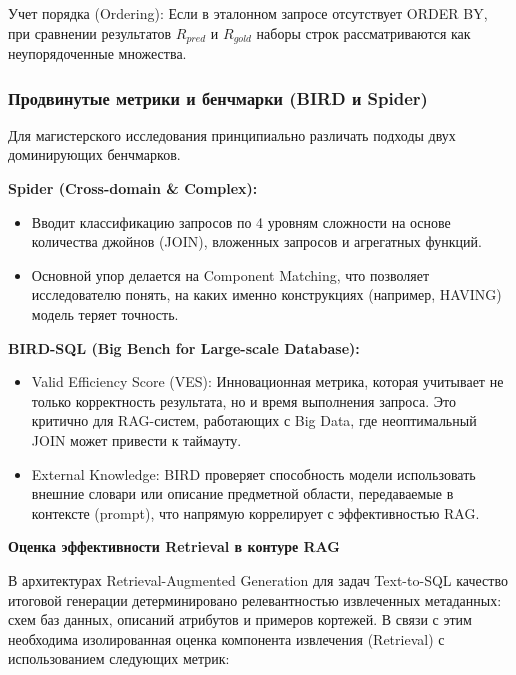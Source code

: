 Учет порядка (Ordering): Если в эталонном запросе отсутствует ORDER BY, при сравнении результатов $R_{pred}$ и $R_{gold}$ наборы строк рассматриваются как неупорядоченные множества.


\subsubsection{Продвинутые метрики и бенчмарки (BIRD и Spider)}

Для магистерского исследования принципиально различать подходы двух доминирующих бенчмарков.

\textbf{Spider (Cross-domain \& Complex):}

\begin{itemize}
    \item Вводит классификацию запросов по 4 уровням сложности на основе количества джойнов (JOIN), вложенных запросов и агрегатных функций.
    \item Основной упор делается на Component Matching, что позволяет исследователю понять, на каких именно конструкциях (например, HAVING) модель теряет точность.
\end{itemize}

\textbf{BIRD-SQL (Big Bench for Large-scale Database):}

\begin{itemize}
    \item Valid Efficiency Score (VES): Инновационная метрика, которая учитывает не только корректность результата, но и время выполнения запроса. Это критично для RAG-систем, работающих с Big Data, где неоптимальный JOIN может привести к таймауту.
    \item External Knowledge: BIRD проверяет способность модели использовать внешние словари или описание предметной области, передаваемые в контексте (prompt), что напрямую коррелирует с эффективностью RAG.
\end{itemize}

\textbf{Оценка эффективности Retrieval в контуре RAG}

В архитектурах Retrieval-Augmented Generation для задач Text-to-SQL качество итоговой генерации детерминировано релевантностью извлеченных метаданных: схем баз данных, описаний атрибутов и примеров кортежей. В связи с этим необходима изолированная оценка компонента извлечения (Retrieval) с использованием следующих метрик:

